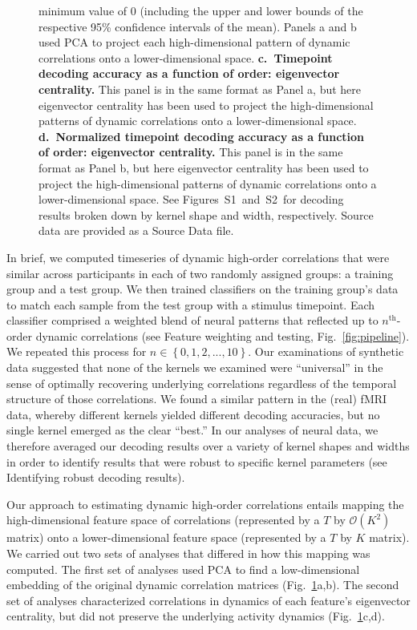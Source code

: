 \documentclass[english]{article}
\newcommand{\kernelshape}{S1}
\newcommand{\kernelwidth}{S2}
\begin{document}
\begin{figure}[tp]
{    minimum value of 0 (including the upper and lower bounds of the
    respective 95\% confidence intervals of the mean).  Panels a and b used PCA to
    project each high-dimensional pattern of dynamic correlations onto
    a lower-dimensional space. \textbf{c.~Timepoint decoding accuracy as a
       function of order: eigenvector centrality.} This panel is in the
    same format as Panel a, but here eigenvector centrality has been
    used to project the high-dimensional patterns of dynamic
    correlations onto a lower-dimensional space.
 \textbf{d.~Normalized timepoint decoding accuracy as a function of order:
       eigenvector centrality.}  This panel is in the same format as
    Panel b, but here eigenvector centrality has been used to project
    the high-dimensional patterns of dynamic correlations onto a
    lower-dimensional space. See
    Figures~\kernelshape~and~\kernelwidth~for decoding results broken
    down by kernel shape and width, respectively. Source data are provided as a Source Data file.}
  \label{fig:decoding}
\end{figure}

In brief, we computed timeseries of dynamic high-order correlations
that were similar across participants in each of two randomly assigned
groups: a training group and a test group.  We then trained
classifiers on the training group's data to match each sample from the
test group with a stimulus timepoint.  Each classifier comprised a
weighted blend of neural patterns that reflected up to
$n^\mathrm{th}$-order dynamic correlations (see Feature
  weighting and testing, Fig.~\ref{fig:pipeline}).  We repeated this process for
$n \in \left\{ 0, 1, 2, ..., 10 \right\}$.  Our examinations of
synthetic data suggested that none of the kernels we examined were
``universal'' in the sense of optimally recovering underlying
correlations regardless of the temporal structure of those
correlations.  We found a similar pattern in the (real) fMRI data,
whereby different kernels yielded different decoding accuracies, but
no single kernel emerged as the clear ``best.''  In our analyses of
neural data, we therefore averaged our decoding results over a variety
of kernel shapes and widths in order to identify results that were
robust to specific kernel parameters (see Identifying robust
  decoding results).

Our approach to estimating dynamic high-order correlations entails
mapping the high-dimensional feature space of correlations
(represented by a $T$ by
$\mathcal{O}(K^2)$ matrix) onto a lower-dimensional feature space
(represented by a $T$ by $K$ matrix).
We carried out two sets of analyses that differed in how this mapping
was computed.  The first set of analyses used PCA to find a
low-dimensional embedding of the original dynamic correlation matrices
(Fig.~\ref{fig:decoding}a,b).  The second set of analyses
characterized correlations in dynamics of each feature's eigenvector
centrality, but did not preserve the underlying activity dynamics
(Fig.~\ref{fig:decoding}c,d).
\end{document}
